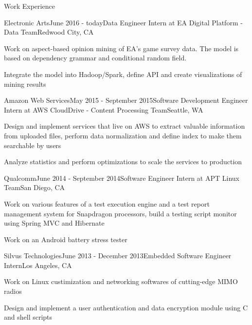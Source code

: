 \documentclass{resume} %
\begin{document}
\begin{rSection}{Work Experience}

\begin{rSubsection}{Electronic Arts}{June 2016 - today}{Data Engineer Intern at EA Digital Platform - Data Team}{Redwood City, CA}
\item Work on aspect-based opinion mining of EA's game survey data. The model is based on dependency grammar and conditional random field.
\item Integrate the model into Hadoop/Spark, define API and create visualizations of mining results
\end{rSubsection}



\begin{rSubsection}{Amazon Web Services}{May 2015 - September 2015}{Software Development Engineer Intern at AWS CloudDrive - Content Processing Team}{Seattle, WA}
\item Design and implement services that live on AWS to extract valuable information from uploaded files, perform data normalization and define index to make them searchable by users
\item Analyze statistics and perform optimizations to scale the services to production
\end{rSubsection}


\begin{rSubsection}{Qualcomm}{June 2014 - September 2014}{Software Engineer Intern at APT Linux Team}{San Diego, CA}
\item Work on various features of a test execution engine and a test report management system for Snapdragon processors, build a testing script monitor using Spring MVC and Hibernate
\item Work on an Android battery stress tester
\end{rSubsection}


\begin{rSubsection}{Silvus Technologies}{June 2013 - December 2013}{Embedded Software Engineer Intern}{Los Angeles, CA}
\item Work on Linux custimization and networking softwares of cutting-edge MIMO radios
\item Design and implement a user authentication and data encryption module using C and shell scripts
\end{rSubsection}

\end{rSection}
\end{document}
